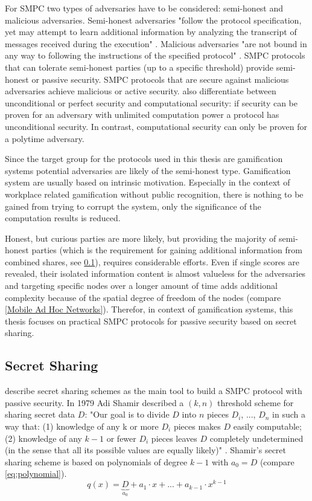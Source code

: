 For \gls{SMPC} two types of adversaries have to be considered: semi-honest and malicious adversaries.
Semi-honest adversaries "follow the protocol specification, yet may attempt to learn additional information by analyzing the transcript of messages received during the execution" \autocite{Aumann2007}. Malicious adversaries "are not bound in any way to following the instructions of the specified protocol" \autocite{Aumann2007}.
\gls{SMPC} protocols that can tolerate semi-honest parties (up to a specific threshold) provide semi-honest or passive security. \gls{SMPC} protocols that are secure against malicious adversaries achieve malicious or active security.
\textcite[p. 82]{Cramer2015} also differentiate between unconditional or perfect security and computational security: if security can be proven for an adversary with unlimited computation power a protocol has unconditional security. In contrast, computational security can only be proven for a polytime adversary.

Since the target group for the protocols used in this thesis are gamification systems potential adversaries are likely of the semi-honest type. Gamification system are usually based on intrinsic motivation. Especially in the context of workplace related gamification without public recognition, there is nothing to be gained from trying to corrupt the system, only the significance of the computation results is reduced.

Honest, but curious parties are more likely, but providing the majority of semi-honest parties (which is the requirement for gaining additional information from combined shares, see \ref{Secret Sharing}), requires considerable efforts. Even if single scores are revealed, their isolated information content is almost valueless for the adversaries and targeting specific nodes over a longer amount of time adds additional complexity because of the spatial degree of freedom of the nodes (compare \ref{Mobile Ad Hoc Networks}).
Therefor, in context of gamification systems, this thesis focuses on practical \gls{SMPC} protocols for passive security based on secret sharing.

\subsection{Secret Sharing}	\label{Secret Sharing}

\textcite[p. 32]{Cramer2015} describe secret sharing schemes as the main tool to build a \gls{SMPC} protocol with passive security. In 1979 Adi Shamir described a $(k, n)$ threshold scheme for sharing secret data $D$: "Our goal is to divide $D$ into $n$ pieces $D_i$, ..., $D_n$ in such a way that:
(1) knowledge of any k or more $D_i$ pieces makes $D$ easily computable; (2) knowledge of any $k-1$ or fewer $D_i$ pieces leaves $D$ completely undetermined (in the sense that all its possible values are equally likely)" \autocite{Shamir1979}.
Shamir's secret sharing scheme is based on polynomials of degree $k-1$ with $a_0=D$ (compare \ref{eq:polynomial}). 
\begin{equation}
\label{eq:polynomial}
q(x)=\underbrace{D}_{a_0} + a_1 \cdot x + ... + a_{k-1} \cdot x^{k-1}
\end{equation}

